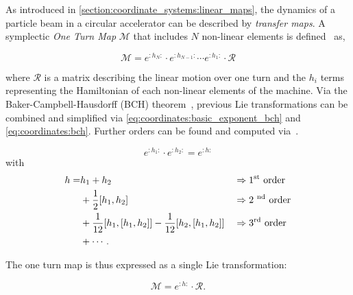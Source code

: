 \subsubsection{}

As introduced in \cref{section:coordinate_systems:linear_maps}, the dynamics of a particle beam in a
circular accelerator can be described by \textit{transfer maps}. A symplectic \textit{One Turn Map}
$\mathcal{M}$ that includes $N$ non-linear elements is defined~\cite{dragt_overview_2013} as,

\begin{equation}
    \mathcal{M} = e^{:h_N:} \cdot e^{:h_{N-1}:} \cdots e^{:h_1:} \cdot \mathcal{R}
\end{equation}

where $\mathcal{R}$ is a matrix describing the linear motion over one turn and the $h_i$ terms
representing the Hamiltonian of each non-linear elements of the machine.
Via the Baker-Campbell-Hausdorff (BCH) theorem~\cite{forest_beam_1998,casas_efficient_2009},
previous Lie transformations can be combined and simplified via
\cref{eq:coordinates:basic_exponent_bch} and \cref{eq:coordinates:bch}. Further orders can be found
and computed via~\cite{casas_efficient_2009}.

\begin{equation}
    e^{:h_1:} \cdot e^{:h_2:} = e^{:h:}
    \label{eq:coordinates:basic_exponent_bch}
\end{equation}
with 
\begin{equation}
    \begin{alignedat}{3}
      h =& h_1 + h_2  && \Rightarrow \text{1\textsuperscript{st} order}\\
             & + \frac{1}{2} [h_1, h_2]  && \Rightarrow \text{2 \textsuperscript{nd} order}\\
             & + \frac{1}{12} [h_1, [h_1, h_2]] - \frac{1}{12} [h_2, [h_1, h_2]] \quad && \Rightarrow \text{3\textsuperscript{rd} order}\\
             & + \cdots.
    \end{alignedat}
    \label{eq:coordinates:bch}
\end{equation}


The one turn map is thus expressed as a single Lie transformation:

\begin{equation}
    \mathcal{M} = e^{:h:} \cdot \mathcal{R}.
   \label{eq:coordinate_systems:non_linear_map}
\end{equation}

